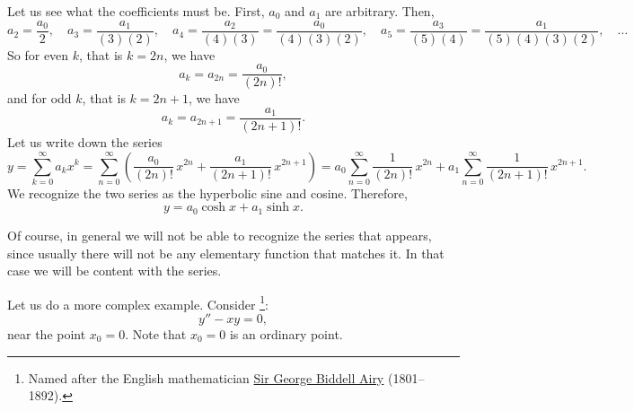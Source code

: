 \documentclass{ximera}
\begin{document}
\begin{exampleSol}
    Let us see what the coefficients must be.  First, $a_0$ and $a_1$ are arbitrary.  Then,
    \begin{equation*}
        a_2 = \frac{a_0}{2}, \quad
        a_3 = \frac{a_1}{(3)(2)}, \quad
        a_4 = \frac{a_2}{(4)(3)} = \frac{a_0}{(4)(3)(2)}, \quad
        a_5 = \frac{a_3}{(5)(4)} = \frac{a_1}{(5)(4)(3)(2)}, \quad \ldots
    \end{equation*}
    So for even $k$, that is $k=2n$, we have
    \begin{equation*}
        a_k = a_{2n} = \frac{a_0}{(2n)!} ,
    \end{equation*}
    and for odd $k$, that is $k=2n+1$, we have
    \begin{equation*}
        a_k = a_{2n+1} = \frac{a_1}{(2n+1)!} .
    \end{equation*}
    Let us write down the series
    \begin{equation*}
        y = \sum_{k=0}^\infty a_k x^k = \sum_{n=0}^\infty \left( \frac{a_0}{(2n)!} \,x^{2n} + \frac{a_1}{(2n+1)!} \,x^{2n+1} \right)
        = a_0 \sum_{n=0}^\infty \frac{1}{(2n)!} \,x^{2n} + a_1 \sum_{n=0}^\infty \frac{1}{(2n+1)!} \,x^{2n+1} .
    \end{equation*}
    We recognize the two series as the hyperbolic sine and cosine. Therefore,
    \begin{equation*}
        y = a_0 \cosh x + a_1 \sinh x .
    \end{equation*}
\end{exampleSol}

Of course, in general we will not be able to recognize the series that appears, since usually there will not be any elementary function that matches it.  In that case we will be content with the series.

\begin{example}
    Let us do a more complex example.  Consider \emph{}%
    \footnote{
        Named after the English mathematician \href{http://en.wikipedia.org/wiki/George_Biddell_Airy}{Sir George Biddell Airy} (1801--1892).
        }:
    \begin{equation*}
        y'' - xy = 0 ,
    \end{equation*}
    near the point $x_0 = 0$.  Note that $x_0 = 0$ is an ordinary point.
\end{example}
\end{document}
